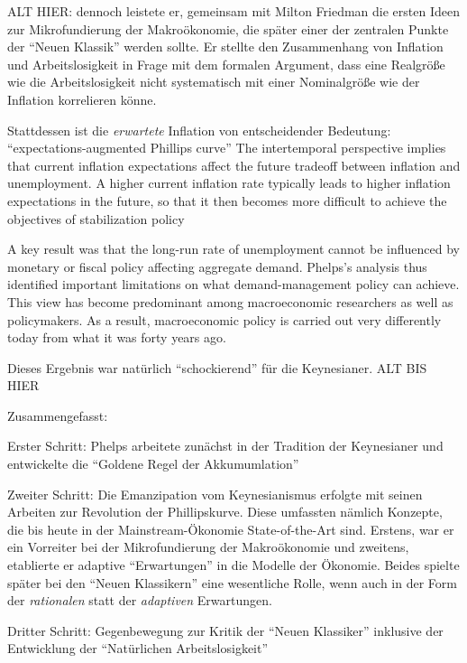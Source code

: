 ALT HIER:
dennoch leistete er, gemeinsam mit Milton Friedman die ersten Ideen zur Mikrofundierung der Makroökonomie, die später einer der zentralen Punkte der "`Neuen Klassik"' werden sollte. Er stellte den Zusammenhang von Inflation und Arbeitslosigkeit in Frage mit dem formalen Argument, dass eine Realgröße wie die Arbeitslosigkeit nicht systematisch mit einer Nominalgröße wie der Inflation korrelieren könne. 

Stattdessen ist die \textit{erwartete} Inflation von entscheidender Bedeutung:  "`expectations-augmented Phillips 
curve"' The intertemporal perspective implies that current inflation expectations affect the future 
tradeoff between inflation and unemployment. A higher current inflation rate typically leads to 
higher inflation expectations in the future, so that it then becomes more difficult to achieve the 
objectives of stabilization policy

A key result was that the long-run rate of unemployment cannot be influenced 
by monetary or fiscal policy affecting aggregate demand. Phelps’s analysis thus identified 
important limitations on what demand-management policy can achieve. This view has become 
predominant among macroeconomic researchers as well as policymakers. As a result, 
macroeconomic policy is carried out very differently today from what it was forty years ago.

Dieses Ergebnis war natürlich "`schockierend"' für die Keynesianer. 
ALT BIS HIER





Zusammengefasst:

Erster Schritt: Phelps arbeitete zunächst in der Tradition der Keynesianer und entwickelte die "`Goldene Regel der Akkumumlation"'

Zweiter Schritt: Die Emanzipation vom Keynesianismus erfolgte mit seinen Arbeiten zur Revolution der Phillipskurve. Diese umfassten nämlich Konzepte, die bis heute in der Mainstream-Ökonomie State-of-the-Art sind. Erstens, war er ein Vorreiter bei der Mikrofundierung der Makroökonomie und zweitens, etablierte er adaptive "`Erwartungen"' in die Modelle der Ökonomie. Beides spielte später bei den "`Neuen Klassikern"' eine wesentliche Rolle, wenn auch in der Form der \textit{rationalen} statt der \textit{adaptiven} Erwartungen. 

Dritter Schritt: Gegenbewegung zur Kritik der "`Neuen Klassiker"' inklusive der Entwicklung der "`Natürlichen Arbeitslosigkeit"'

